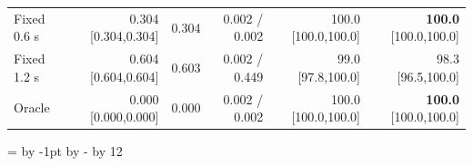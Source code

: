 \begin{table}[!htbp]
{\begin{tabular}{lrrrrr}
Fixed 0.6 s & 0.304 \textcolor{black!60}{[0.304,0.304]} & 0.304 & 0.002 / 0.002 & 100.0 \textcolor{black!60}{[100.0,100.0]} & \cellcolor{ebCoral!35}\textbf{100.0} \textcolor{black!60}{[100.0,100.0]} \\
Fixed 1.2 s & 0.604 \textcolor{black!60}{[0.604,0.604]} & 0.603 & 0.002 / 0.449 & 99.0 \textcolor{black!60}{[97.8,100.0]} & 98.3 \textcolor{black!60}{[96.5,100.0]} \\
Oracle & 0.000 \textcolor{black!60}{[0.000,0.000]} & 0.000 & 0.002 / 0.002 & 100.0 \textcolor{black!60}{[100.0,100.0]} & \cellcolor{ebCoral!35}\textbf{100.0} \textcolor{black!60}{[100.0,100.0]} \\
\bottomrule
\end{tabular}}
\setlength{\tabcolsep}{0pt}
=\linewidth\advance{} by -1pt\advance{} by -\divide{} by 12
\ifdim\dimen0<1.5pt \dimen0=1.5pt\fi
\setlength{\tabcolsep}{\dimen0}\familytab
\end{table}

